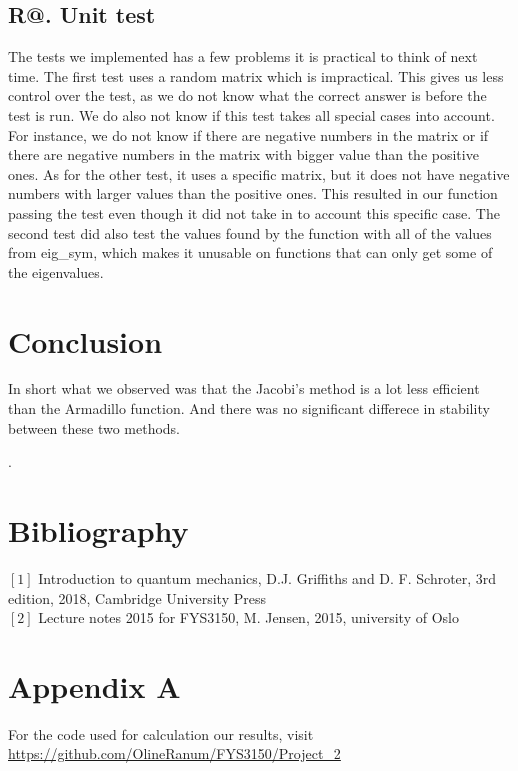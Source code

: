 \documentclass[%
reprint,
amsmath, 
amssymb, 
aps,]{revtex4-1}
\makeatletter
\newcommand*{\rom}[1]{\expandafter\@slowromancap\romannumeral #1@}
\makeatother
\begin{document}
		\subsection*{R\rom{5}. Unit test}
The tests we implemented has a few problems it is practical to think of next time. The first test uses a random matrix which is impractical. This gives us less control over the test, as we do not know what the correct answer is before the test is run. We do also not know if this test takes all special cases into account. For instance, we do not know if there are negative numbers in the matrix or if there are negative numbers in the matrix with bigger value than the positive ones. As for the other test, it uses a specific matrix, but it does not have negative numbers with larger values than the positive ones. This resulted in our function passing the test even though it did not take in to account this specific case. The second test did also test the values found by the function with all of the values from eig\_sym, which makes it unusable on functions that can only get some of the eigenvalues.


	\section*{Conclusion}
In short what we observed was that the Jacobi's method is a lot less efficient than the Armadillo function. And there was no significant differece in stability between these two methods.

\newpage .
\newpage 
\onecolumngrid
\section*{Bibliography}
\noindent $[1]$ Introduction to quantum mechanics, D.J. Griffiths and D. F. Schroter, 3rd edition, 2018, Cambridge University Press\\ 
$[2]$ Lecture notes 2015 for FYS3150, M. Jensen, 2015, university of Oslo
\section*{Appendix A}
For the code used for calculation our results, visit
\url{https://github.com/OlineRanum/FYS3150/Project_2}
\end{document}
